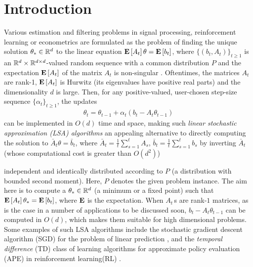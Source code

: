 
\section{Introduction}\label{sec:intro}
Various estimation and filtering problems in signal processing, reinforcement learning or econometrics
are formulated as the problem of finding the unique solution $\theta_*\in \mathbb{R}^d$ 
to the linear equation $\mathbf{E}\left[A_t\right] \theta = \mathbf{E}\left[b_t\right]$,
where $\{(b_t,A_t)\}_{t\ge 1}$ is an $\mathbb{R}^d \times \mathbb{R}^{d \times d}$-valued random sequence with a common distribution $P$
and the expectation $\mathbf{E}\left[A_t\right]$ of the matrix $A_t$ is non-singular \citep[e.g.,][]{bemepri90,LjPfWa92,SoKo94,degylu96,
sutton,konda-tsitsiklis,KoTsi03LSA,gtd,gtd2,gtdmp}.
Oftentimes, the matrices $A_t$ are rank-1, $\mathbf{E}\left[A_t\right]$ is Hurwitz (its eigenvalues have positive real parts)
and the dimensionality $d$ is large.
Then, for any positive-valued, user-chosen step-size sequence $\{\alpha_t\}_{t\ge 1}$, the updates
\begin{align}\label{eq:lsaintro}
\theta_t=\theta_{t-1}+\alpha_t (b_t-A_t \theta_{t-1})
\end{align}
can be implemented in $O(d)$ time and space, making such 
\emph{linear stochastic approximation (LSA) algorithms} 
an appealing alternative to directly 
computing the solution to $\bar A_t \theta = \bar b_t$, where $\bar A_t = \frac1t\sum_{s=1}^t A_s$, $\bar b_t = \frac1t \sum_{s=1}^t b_s$ by inverting $\bar A_t$ (whose computational cost is greater than $O(d^2)$)

independent and identically distributed according to $P$ (a distribution with bounded second moment). Here, $P$ denotes the given problem instance. The aim here is to compute a $\theta_*\in\mathbb{R}^d$ (a minimum or a fixed point) such that $\mathbf{E}\left[A_t\right]\theta_*=\mathbf{E}\left[b_t\right]$, where $\mathbf{E}$ is the expectation. When $A_t\,$s are rank-$1$ matrices, as is the case in a number of applications to be discussed soon, $b_t -A_t\theta_{t-1}$ can be computed in $O(d)$, which makes them suitable for high dimensional problems. Some examples of such LSA algorithms include the stochastic gradient descent algorithm (SGD) for the problem of linear prediction \cite{bach,bachaistats}, and the \emph{temporal difference} (TD) class of learning algorithms for approximate policy evaluation (APE) in reinforcement learning(RL) \cite{sutton,konda-tsitsiklis,KoTsi03LSA,gtd,gtd2,gtdmp}.
\fi


